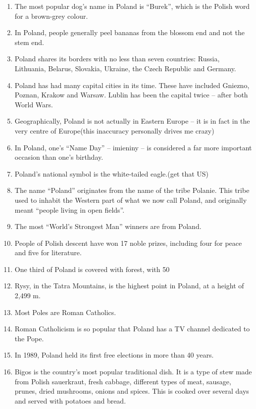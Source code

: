 \documentclass{42-en}
\begin{document}
            \begin{enumerate}\itemsep7pt
                \item The most popular dog’s name in Poland is “Burek”, which is the Polish word for a brown-grey colour.
                \item In Poland, people generally peel bananas from the blossom end and not the stem end.
                \item Poland shares its borders with no less than seven countries: Russia, Lithuania, Belarus, Slovakia, Ukraine, the Czech Republic and Germany.
                \item Poland has had many capital cities in its time. These have included Gniezno, Poznan, Krakow and Warsaw. Lublin has been the capital twice – after both World Wars.
                \item Geographically, Poland is not actually in Eastern Europe – it is in fact in the very centre of Europe(this inaccuracy personally drives me crazy)
                \item In Poland, one’s “Name Day” – imieniny – is considered a far more important occasion than one’s birthday.
                \item Poland’s national symbol is the white-tailed eagle.(get that US)
                \item The name “Poland” originates from the name of the tribe Polanie. This tribe used to inhabit the Western part of what we now call Poland, and originally meant “people living in open fields”.
                \item The most “World’s Strongest Man” winners are from Poland.
                \item People of Polish descent have won 17 noble prizes, including four for peace and five for literature.
                \item One third of Poland is covered with forest, with 50%
                \item Rysy, in the Tatra Mountains, is the highest point in Poland, at a height of 2,499 m.
                \item Most Poles are Roman Catholics.
                \item Roman Catholicism is so popular that Poland has a TV channel dedicated to the Pope.
                \item In 1989, Poland held its first free elections in more than 40 years.
                \item Bigos is the country’s most popular traditional dish. It is a type of stew made from Polish sauerkraut, fresh cabbage, different types of meat, sausage, prunes, dried mushrooms, onions and spices. This is cooked over several days and served with potatoes and bread.

\end{enumerate}
\end{document}
